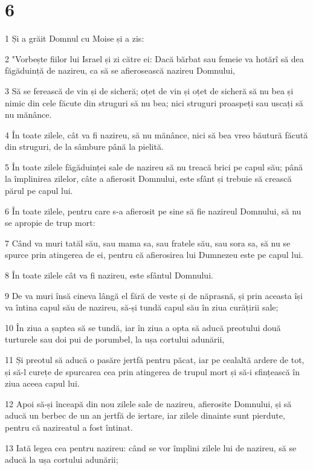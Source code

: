 \chapter{6}

\par 1 Și a grăit Domnul cu Moise și a zis:
\par 2 "Vorbește fiilor lui Israel și zi către ei: Dacă bărbat sau femeie va hotărî să dea făgăduință de nazireu, ca să se afierosească nazireu Domnului,
\par 3 Să se ferească de vin și de sicheră; oțet de vin și oțet de sicheră să nu bea și nimic din cele făcute din struguri să nu bea; nici struguri proaspeți sau uscați să nu mănânce.
\par 4 În toate zilele, cât va fi nazireu, să nu mănânce, nici să bea vreo băutură făcută din struguri, de la sâmbure până la pielită.
\par 5 În toate zilele făgăduinței sale de nazireu să nu treacă brici pe capul său; până la împlinirea zilelor, câte a afierosit Domnului, este sfânt și trebuie să crească părul pe capul lui.
\par 6 În toate zilele, pentru care s-a afierosit pe sine să fie nazireul Domnului, să nu se apropie de trup mort:
\par 7 Când va muri tatăl său, sau mama sa, sau fratele său, sau sora sa, să nu se spurce prin atingerea de ei, pentru că afierosirea lui Dumnezeu este pe capul lui.
\par 8 În toate zilele cât va fi nazireu, este sfântul Domnului.
\par 9 De va muri însă cineva lângă el fără de veste și de năprasnă, și prin aceasta își va întina capul său de nazireu, să-și tundă capul său în ziua curățirii sale;
\par 10 În ziua a șaptea să se tundă, iar în ziua a opta să aducă preotului două turturele sau doi pui de porumbel, la ușa cortului adunării,
\par 11 Și preotul să aducă o pasăre jertfă pentru păcat, iar pe cealaltă ardere de tot, și să-l curețe de spurcarea cea prin atingerea de trupul mort și să-i sfințească în ziua aceea capul lui.
\par 12 Apoi să-și înceapă din nou zilele sale de nazireu, afierosite Domnului, și să aducă un berbec de un an jertfă de iertare, iar zilele dinainte sunt pierdute, pentru că nazireatul a fost întinat.
\par 13 Iată legea cea pentru nazireu: când se vor împlini zilele lui de nazireu, să se aducă la ușa cortului adunării;
